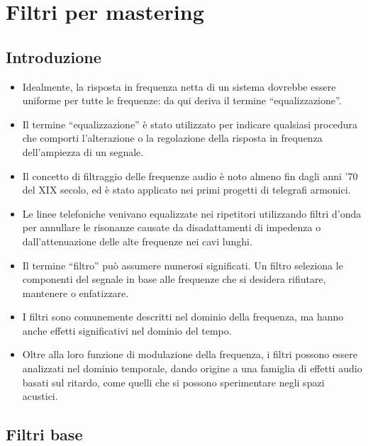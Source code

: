 \chapter{Filtri per mastering}

\section{Introduzione}

\begin{itemize}
    \item Idealmente, la risposta in frequenza netta di un sistema dovrebbe essere uniforme per tutte le frequenze: da qui deriva il termine ``equalizzazione''.
    
    \item Il termine ``equalizzazione'' è stato utilizzato per indicare qualsiasi procedura che comporti l'alterazione o la regolazione della risposta in frequenza dell’ampiezza di un segnale.
    
    \item Il concetto di filtraggio delle frequenze audio è noto almeno fin dagli anni '70 del XIX secolo, ed è stato applicato nei primi progetti di telegrafi armonici.
    
    \item Le linee telefoniche venivano equalizzate nei ripetitori utilizzando filtri d'onda per annullare le risonanze causate da disadattamenti di impedenza o dall'attenuazione delle alte frequenze nei cavi lunghi.
    
    \item Il termine ``filtro'' può assumere numerosi significati. Un filtro seleziona le componenti del segnale in base alle frequenze che si desidera rifiutare, mantenere o enfatizzare.
    
    \item I filtri sono comunemente descritti nel dominio della frequenza, ma hanno anche effetti significativi nel dominio del tempo.
    
    \item Oltre alla loro funzione di modulazione della frequenza, i filtri possono essere analizzati nel dominio temporale, dando origine a una famiglia di effetti audio basati sul ritardo, come quelli che si possono sperimentare negli spazi acustici.
\end{itemize}

\section{Filtri base}

